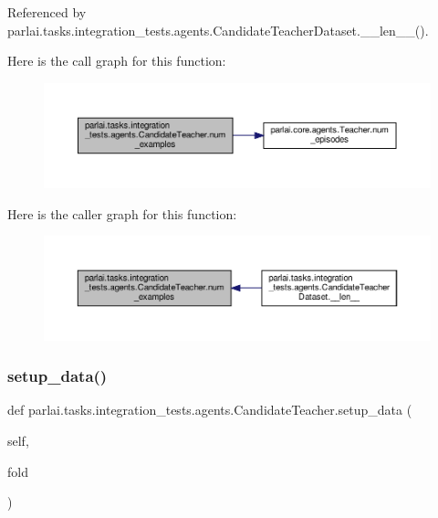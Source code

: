 Referenced by parlai.\+tasks.\+integration\+\_\+tests.\+agents.\+Candidate\+Teacher\+Dataset.\+\_\+\+\_\+len\+\_\+\+\_\+().

Here is the call graph for this function\+:
\nopagebreak
\begin{figure}[H]
\begin{center}
\leavevmode
\includegraphics[width=350pt]{classparlai_1_1tasks_1_1integration__tests_1_1agents_1_1CandidateTeacher_a8dec3a8ce8311214b44c936f0805e13a_cgraph}
\end{center}
\end{figure}
Here is the caller graph for this function\+:
\nopagebreak
\begin{figure}[H]
\begin{center}
\leavevmode
\includegraphics[width=350pt]{classparlai_1_1tasks_1_1integration__tests_1_1agents_1_1CandidateTeacher_a8dec3a8ce8311214b44c936f0805e13a_icgraph}
\end{center}
\end{figure}
\mbox{\label{classparlai_1_1tasks_1_1integration__tests_1_1agents_1_1CandidateTeacher_a9dafcc2731525aa45337b2d6816ad9a6}} 
\subsubsection{\texorpdfstring{setup\+\_\+data()}{setup\_data()}}
{\footnotesize\ttfamily def parlai.\+tasks.\+integration\+\_\+tests.\+agents.\+Candidate\+Teacher.\+setup\+\_\+data (\begin{DoxyParamCaption}\item[{}]{self,  }\item[{}]{fold }\end{DoxyParamCaption})}



